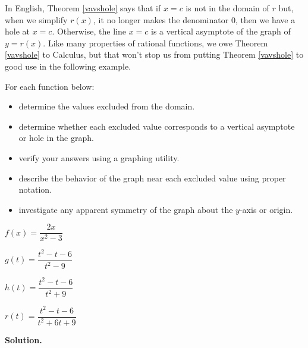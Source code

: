 \begin{ex}
\begin{mthm}
\begin{itemize}
\end{itemize}

\end{mthm}

In English,  Theorem \ref{vavshole} says that if $x=c$ is not in the domain of $r$ but, when we simplify $r(x)$, it no longer makes the denominator $0$, then we have a hole at $x=c$.  Otherwise, the line $x=c$ is a vertical asymptote  of the graph of $y=r(x)$.   Like many properties of rational functions, we owe Theorem \ref{vavshole} to Calculus, but that won't stop us from  putting Theorem \ref{vavshole} to good use in the following example.

\begin{ex}  \label{vavsholeexample}  For each function below:

\begin{itemize}

\item  determine the values excluded from the domain.

\item   determine whether each excluded value corresponds to a vertical asymptote or hole in the graph.

\item  verify your answers using a graphing utility.

\item  describe the behavior of the graph near each excluded value using proper notation.  

\item  investigate any apparent symmetry of the graph about the $y$-axis or origin.

\end{itemize}

\begin{shortenumerate}[MMMMMM]
\item  $f(x) = \dfrac{2x}{x^2-3}$
\item  $g(t) = \dfrac{t^2-t-6}{t^2-9}$
\item  $h(t) = \dfrac{t^2-t-6}{t^2+9}$
\item  $r(t) = \dfrac{t^2-t-6}{t^2+6t+9}$
\end{shortenumerate}


{ \bf Solution.} 

\begin{enumerate}


\end{enumerate}
\end{ex}
\end{ex}
